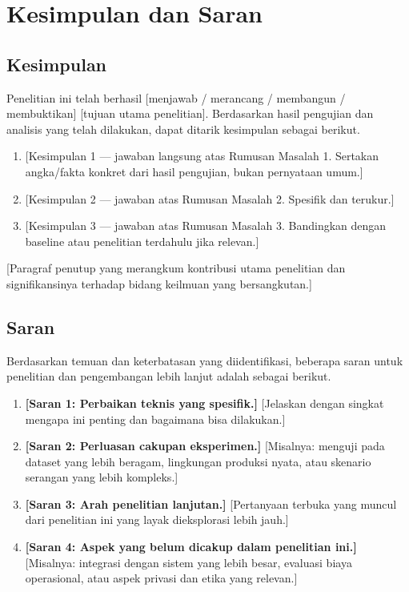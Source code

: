 
\chapter{Kesimpulan dan Saran}

\section{Kesimpulan}
\label{sec:7.1}

Penelitian ini telah berhasil [menjawab / merancang / membangun / membuktikan] [tujuan utama
penelitian]. Berdasarkan hasil pengujian dan analisis yang telah dilakukan, dapat
ditarik kesimpulan sebagai berikut.

\begin{enumerate}
  \item {[Kesimpulan 1 — jawaban langsung atas Rumusan Masalah 1. Sertakan angka/fakta
        konkret dari hasil pengujian, bukan pernyataan umum.]}

  \item {[Kesimpulan 2 — jawaban atas Rumusan Masalah 2. Spesifik dan terukur.]}

  \item {[Kesimpulan 3 — jawaban atas Rumusan Masalah 3. Bandingkan dengan baseline atau
        penelitian terdahulu jika relevan.]}
\end{enumerate}

[Paragraf penutup yang merangkum kontribusi utama penelitian dan signifikansinya terhadap
bidang keilmuan yang bersangkutan.]

\section{Saran}
\label{sec:7.2}

Berdasarkan temuan dan keterbatasan yang diidentifikasi, beberapa saran untuk penelitian
dan pengembangan lebih lanjut adalah sebagai berikut.

\begin{enumerate}
  \item \textbf{[Saran 1: Perbaikan teknis yang spesifik.]}
        [Jelaskan dengan singkat mengapa ini penting dan bagaimana bisa dilakukan.]

  \item \textbf{[Saran 2: Perluasan cakupan eksperimen.]}
        [Misalnya: menguji pada dataset yang lebih beragam, lingkungan produksi nyata,
        atau skenario serangan yang lebih kompleks.]

  \item \textbf{[Saran 3: Arah penelitian lanjutan.]}
        [Pertanyaan terbuka yang muncul dari penelitian ini yang layak dieksplorasi
        lebih jauh.]

  \item \textbf{[Saran 4: Aspek yang belum dicakup dalam penelitian ini.]}
        [Misalnya: integrasi dengan sistem yang lebih besar, evaluasi biaya operasional,
        atau aspek privasi dan etika yang relevan.]
\end{enumerate}
